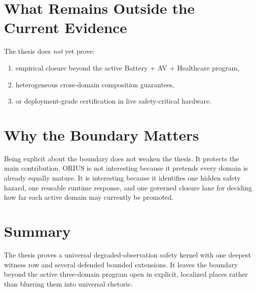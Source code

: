 \section{What Remains Outside the Current Evidence}

The thesis does \emph{not} yet prove:

\begin{enumerate}
  \item empirical closure beyond the active Battery + AV + Healthcare program,
  \item heterogeneous cross-domain composition guarantees,
  \item or deployment-grade certification in live safety-critical hardware.
\end{enumerate}

\section{Why the Boundary Matters}

Being explicit about the boundary does not weaken the thesis. It protects the
main contribution. ORIUS is not interesting because it pretends every domain is
already equally mature. It is interesting because it identifies one hidden
safety hazard, one reusable runtime response, and one governed closure lane for
deciding how far each active domain may currently be promoted.

\section{Summary}

The thesis proves a universal degraded-observation safety kernel with one
deepest witness row and several defended bounded extensions. It leaves the
boundary beyond the active three-domain program open in explicit, localized
places rather than blurring them into universal rhetoric.
